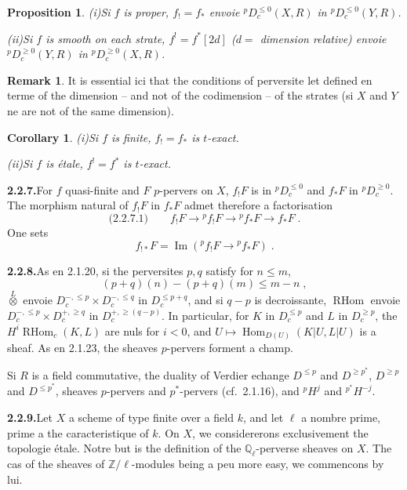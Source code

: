 \documentclass[12pt,a4paper]{article}
\theoremstyle{plain}
\newtheorem{proposition}[theorem]{Proposition}
\newtheorem{corollary}[theorem]{Corollary}
\theoremstyle{definition}
\newtheorem{remark}[theorem]{Remark}
\DeclareMathOperator{\Hom}{Hom}
\DeclareMathOperator{\im}{Im}
\DeclareMathOperator{\RHom}{RHom}
\begin{document}
\begin{proposition}\label{prop:2.2.5}
\emph{(i)}\quad Si $f$ is proper, $f_! = f_*$ envoie ${}^p D_c^{\leqslant 0}(X, R)$ in ${}^p D_c^{\leqslant 0}(Y, R)$.

\emph{(ii)}\quad Si $f$ is smooth on each strate, $f^! = f^*[2d]$ ($d =$ dimension relative) envoie ${}^p D_c^{\geqslant 0}(Y, R)$ in ${}^p D_c^{\geqslant 0}(X, R)$.
\end{proposition}

\begin{remark}
It is essential ici that the conditions of perversite let defined en terme of the dimension -- and not of the codimension -- of the strates (si $X$ and $Y$ ne are not of the same dimension).
\end{remark}

\begin{corollary}\label{cor:2.2.6}
\emph{(i)}\quad Si $f$ is finite, $f_! = f_*$ is $t$-exact.

\emph{(ii)}\quad Si $f$ is étale, $f^! = f^*$ is $t$-exact.
\end{corollary}

\smallskip
\noindent\textbf{2.2.7.}\quad For $f$ quasi-finite and $F$ $p$-pervers on $X$, $f_! F$ is in ${}^p D_c^{\leqslant 0}$ and $f_* F$ in ${}^p D_c^{\geqslant 0}$. The morphism natural of $f_! F$ in $f_* F$ admet therefore a factorisation
\[
\text{(2.2.7.1)}\qquad f_! F \to {}^p f_! F \to {}^p f_* F \to f_* F\;.
\]
One sets
\[
f_{!*} F = \im({}^p f_! F \to {}^p f_* F)\;.
\]

\smallskip
\noindent\textbf{2.2.8.}\quad As en 2.1.20, si the perversites $p, q$ satisfy for $n \leqslant m$,
\[
(p+q)(n) - (p+q)(m) \leqslant m - n\;,
\]
$\overset{L}{\otimes}$ envoie $D_c^{-, \leqslant p} \times D_c^{-, \leqslant q}$ in $D_c^{\leqslant p+q}$, and si $q-p$ is decroissante, $\RHom$ envoie $D_c^{-, \leqslant p} \times D_c^{+, \geqslant q}$ in $D_c^{+, \geqslant (q-p)}$. In particular, for $K$ in $D_c^{\leqslant p}$ and $L$ in $D_c^{\geqslant p}$, the $H^i \RHom_c(K, L)$ are nuls for $i < 0$, and $U \mapsto \Hom_{D(U)}(K|U, L|U)$ is a sheaf. As en 2.1.23, the sheaves $p$-pervers forment a champ.

Si $R$ is a field commutative, the duality of Verdier echange $D^{\leqslant p}$ and $D^{\geqslant p^*}$, $D^{\geqslant p}$ and $D^{\leqslant p^*}$, sheaves $p$-pervers and $p^*$-pervers (cf.~2.1.16), and ${}^p H^j$ and ${}^{p^*} H^{-j}$.

\smallskip
\noindent\textbf{2.2.9.}\quad Let $X$ a scheme of type finite over a field $k$, and let $\ell$ a nombre prime, prime a the caracteristique of $k$. On $X$, we considererons exclusivement the topologie étale. Notre but is the definition of the $\mathbb{Q}_\ell$-perverse sheaves on $X$. The cas of the sheaves of $\mathbb{Z}/\ell$-modules being a peu more easy, we commencons by lui.
\end{document}
